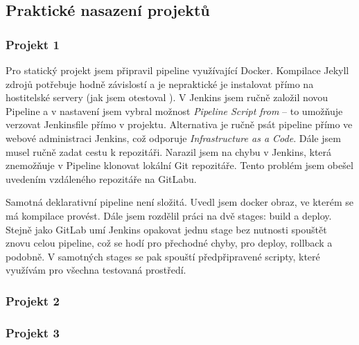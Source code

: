     \subsection{Praktické nasazení projektů}
        \subsubsection{Projekt 1}
            Pro statický projekt jsem připravil pipeline využívající Docker. Kompilace Jekyll zdrojů potřebuje hodně závislostí a je nepraktické je instalovat přímo na hostitelské servery (jak jsem otestoval ). V Jenkins jsem ručně založil novou Pipeline a v nastavení jsem vybral možnost \textit{Pipeline Script from } -- to umožňuje verzovat Jenkinsfile přímo v projektu. Alternativa je ručně psát pipeline přímo ve webové administraci Jenkins, což odporuje \textit{Infrastructure as a Code}. Dále jsem musel ručně zadat cestu k repozitáři. Narazil jsem na chybu v Jenkins, která znemožňuje v Pipeline klonovat lokální Git repozitáře. Tento problém jsem obešel uvedením vzdáleného repozitáře na GitLabu.

            Samotná deklarativní pipeline není složitá. Uvedl jsem docker obraz, ve kterém se má kompilace provést. Dále jsem rozdělil práci na dvě stages: build a deploy. Stejně jako GitLab umí Jenkins opakovat jednu stage bez nutnosti spouštět znovu celou pipeline, což se hodí pro přechodné chyby, pro deploy, rollback a podobně. V samotných stages se pak spouští předpřipravené scripty, které využívám pro všechna testovaná \CICD prostředí.

        \subsubsection{Projekt 2}
            \blind[2]


        \subsubsection{Projekt 3}
            \blind[2]
